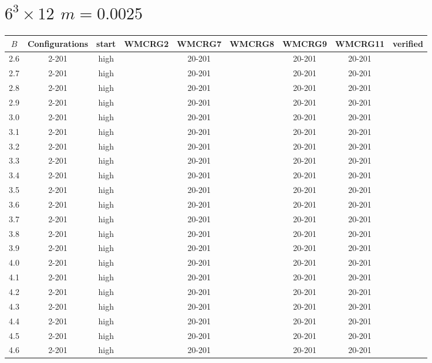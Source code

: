 \documentclass{article}
\begin{document}
  \section*{$6^3\times12$  $m=0.0025$}
    \begin{center}
    \begin{tabular}{| c | c | c | c | c | c | c | c | c |}
      \hline
      $B$ & Configurations & start & WMCRG2 & WMCRG7 & WMCRG8 & WMCRG9 & WMCRG11 & verified\\
      \hline
      2.6 & 2-201 & high &  & 20-201 &  & 20-201 & 20-201 &\\
      2.7 & 2-201 & high &  & 20-201 &  & 20-201 & 20-201 &\\
      2.8 & 2-201 & high &  & 20-201 &  & 20-201 & 20-201 &\\
      2.9 & 2-201 & high &  & 20-201 &  & 20-201 & 20-201 &\\
      3.0 & 2-201 & high &  & 20-201 &  & 20-201 & 20-201 &\\
      3.1 & 2-201 & high &  & 20-201 &  & 20-201 & 20-201 &\\
      3.2 & 2-201 & high &  & 20-201 &  & 20-201 & 20-201 &\\
      3.3 & 2-201 & high &  & 20-201 &  & 20-201 & 20-201 &\\
      3.4 & 2-201 & high &  & 20-201 &  & 20-201 & 20-201 &\\
      3.5 & 2-201 & high &  & 20-201 &  & 20-201 & 20-201 &\\
      3.6 & 2-201 & high &  & 20-201 &  & 20-201 & 20-201 &\\
      3.7 & 2-201 & high &  & 20-201 &  & 20-201 & 20-201 &\\
      3.8 & 2-201 & high &  & 20-201 &  & 20-201 & 20-201 &\\
      3.9 & 2-201 & high &  & 20-201 &  & 20-201 & 20-201 &\\
      4.0 & 2-201 & high &  & 20-201 &  & 20-201 & 20-201 &\\
      4.1 & 2-201 & high &  & 20-201 &  & 20-201 & 20-201 &\\
      4.2 & 2-201 & high &  & 20-201 &  & 20-201 & 20-201 &\\
      4.3 & 2-201 & high &  & 20-201 &  & 20-201 & 20-201 &\\
      4.4 & 2-201 & high &  & 20-201 &  & 20-201 & 20-201 &\\
      4.5 & 2-201 & high &  & 20-201 &  & 20-201 & 20-201 &\\
      4.6 & 2-201 & high &  & 20-201 &  & 20-201 & 20-201 &\\

\end{tabular}
\end{center}
\end{document}
